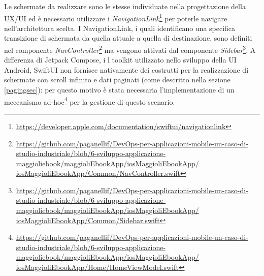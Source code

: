 Le schermate da realizzare sono le stesse individuate nella progettazione della UX/UI ed è necessario utilizzare i \textit{NavigationLink}\footnote{\href{https://developer.apple.com/documentation/swiftui/navigationlink}{https://developer.apple.com/documentation/swiftui/navigationlink}} per poterle navigare nell'architettura scelta.
I NavigationLink, i quali identificano una specifica transizione di schermata da quella attuale a quella di destinazione, sono definiti nel componente \textit{NavController}\footnote{\href{https://github.com/paganellif/DevOps-per-applicazioni-mobile-un-caso-di-studio-industriale/blob/6-sviluppo-applicazione-maggioliebook/maggioliEbookApp/iosMaggioliEbookApp/iosMaggioliEbookApp/Common/NavController.swift}{https://github.com/paganellif/DevOps-per-applicazioni-mobile-un-caso-di-studio-industriale/blob/6-sviluppo-applicazione-maggioliebook/maggioliEbookApp/iosMaggioliEbookApp/\\iosMaggioliEbookApp/Common/NavController.swift}} ma vengono attivati dal componente \textit{Sidebar}\footnote{\href{https://github.com/paganellif/DevOps-per-applicazioni-mobile-un-caso-di-studio-industriale/blob/6-sviluppo-applicazione-maggioliebook/maggioliEbookApp/iosMaggioliEbookApp/iosMaggioliEbookApp/Common/Sidebar.swift}{https://github.com/paganellif/DevOps-per-applicazioni-mobile-un-caso-di-studio-industriale/blob/6-sviluppo-applicazione-maggioliebook/maggioliEbookApp/iosMaggioliEbookApp/\\iosMaggioliEbookApp/Common/Sidebar.swift}}. 
A differenza di Jetpack Compose, i
l toolkit utilizzato nello sviluppo della UI Android, 
SwiftUI non fornisce nativamente dei costrutti per la realizzazione di schermate con scroll infinito e dati paginati (come descritto nella sezione \ref{pagingsec}): 
per questo motivo è stata necessaria l'implementazione di un meccanismo ad-hoc\footnote{\href{https://github.com/paganellif/DevOps-per-applicazioni-mobile-un-caso-di-studio-industriale/blob/6-sviluppo-applicazione-maggioliebook/maggioliEbookApp/iosMaggioliEbookApp/iosMaggioliEbookApp/Home/HomeViewModel.swift}{https://github.com/paganellif/DevOps-per-applicazioni-mobile-un-caso-di-studio-industriale/blob/6-sviluppo-applicazione-maggioliebook/maggioliEbookApp/iosMaggioliEbookApp/\\iosMaggioliEbookApp/Home/HomeViewModel.swift}} per la gestione di questo scenario.

